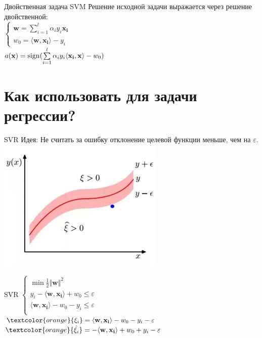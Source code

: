 \documentclass[10pt]{beamer}
\begin{document}
\begin{frame}{Двойственная задача SVM}
	Решение исходной задачи выражается через решение двойственной:\\
	$\begin{cases}
	\mathbf{w} = \sum\limits_{i = 1}^l \alpha_iy_i\mathbf{x_i}\\
	w_0 = \langle \mathbf{w}, \mathbf{x_i} \rangle - y_i
	\end{cases}$\\
	\bigbreak
	\pause
	$a(\mathbf{x}) = \operatorname{sign}(\sum\limits_{i=1}^l \alpha_iy_i \langle \mathbf{x_i}, \mathbf{x} \rangle - w_0)$
\end{frame}

\section{Как использовать для задачи регрессии?}

\begin{frame}{SVR}
  \alert{Идея}: Не считать за ошибку отклонение целевой функции меньше, чем на $\varepsilon$.
  \bigbreak
  \pause
  \centering
  \includegraphics[height=0.7 \textheight, keepaspectratio]{images/svr}
\end{frame}

\begin{frame}{SVR}
  $\begin{cases}
		\min \frac{1}{2}\Vert \mathbf{w} \Vert^2 \\
		y_i - \langle \mathbf{w}, \mathbf{x_i} \rangle + w_0 \leq \varepsilon \\
		\langle \mathbf{w}, \mathbf{x_i} \rangle - w_0 - y_i \leq \varepsilon \\
	\end{cases}$\\
	\bigbreak
  \pause
  $\textcolor{orange}{\xi_i} = \langle \mathbf{w}, \mathbf{x_i} \rangle - w_0 - y_i - \varepsilon $\\
  $\textcolor{orange}{\hat{\xi_i}} = -\langle \mathbf{w}, \mathbf{x_i} \rangle + w_0 + y_i - \varepsilon $
\end{frame}
\end{document}
